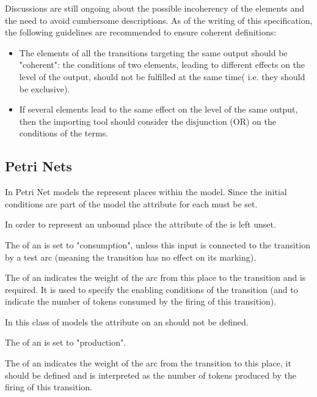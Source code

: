Discussions are still ongoing about the possible incoherency of the  elements and the need to avoid cumbersome descriptions. As of the writing of this specification, the following guidelines are recommended to ensure coherent definitions:
\begin{itemize}
\item The  elements of all the transitions targeting the same output should be "coherent": the conditions of two  elements, leading to different effects on the level of the output, should not be fulfilled at the same time( i.e. they should be exclusive).
\item If several  elements lead to the same effect on the level of the same output, then the importing tool should consider the disjunction (OR) on the conditions of the terms. 
\end{itemize}
 
\subsection{Petri Nets}

In Petri Net models the \QualitativeSpecies represent places within the model. Since the initial conditions are part of the model the  attribute for each \QualitativeSpecies must be set.

In order to represent an unbound place the  attribute of the \QualitativeSpecies is left unset.

The  of an  is set to "consumption", unless this input is connected to the transition by a test arc (meaning the transition has no effect on its marking). 

The  of an \Input indicates the weight of the arc from this place to the transition and is required. It is used to specify the enabling conditions of the transition (and to indicate the number of tokens consumed by the firing of this transition). 

In this class of models the  attribute on an \Input should not be defined.

The  of an  is set to "production". 

The  of an \Output indicates the weight of the arc from the transition to this place, it should be defined and is interpreted as  the number of tokens produced by the firing of this transition.





